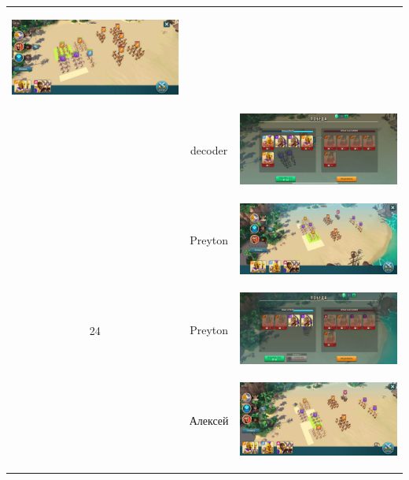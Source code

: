 \begin{longtable}{|c|c|c|}
	\hypertarget{fight23}{\includegraphics[width=0.75\linewidth]{./parts/media/TreasureHunt/23/decoder/photo_2022-04-13_16-27-58.jpg}} \\
	& decoder &
	\includegraphics[width=0.75\linewidth]{./parts/media/TreasureHunt/23/decoder/photo_2022-04-13_16-28-07.jpg} \\
	\hline
	\multirow{6}{*}{24} & Preyton &
	\hypertarget{fight24}{\includegraphics[width=0.75\linewidth]{./parts/media/TreasureHunt/24/Preyton/24.jpg}} \\
	& Preyton &
	\includegraphics[width=0.75\linewidth]{./parts/media/TreasureHunt/24/Preyton/24..jpg} \\
	\hline
	\multirow{6}{*}{24} & Алексей &
	\hypertarget{fight24}{\includegraphics[width=0.75\linewidth]{./parts/media/TreasureHunt/24/alexey/photo_2022-04-13_19-02-08.jpg}} \\

\end{longtable}
